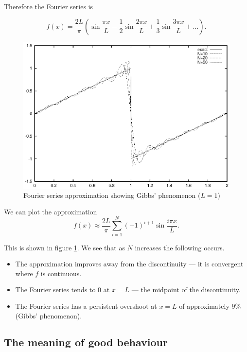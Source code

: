 \documentclass{notes}
\theoremstyle{plain}
\begin{document}
Therefore the Fourier series is

\[
f(x) = \frac{2 L}{\pi} \left( \sin \frac{\pi x}{L} -
\frac{1}{2} \sin \frac{2 \pi x}{L} + \frac{1}{3} \sin \frac{3 \pi
  x}{L}
+ \dots \right).
\]

\begin{figure}
\begin{center}
\includegraphics[scale=0.9]{sawtooth.eps}
\end{center}
\caption{Fourier series approximation showing Gibbs' phenomenon ($L = 1$)}%
\label{fig:sawtooth}
\end{figure}

We can plot the approximation
\[
f(x) \approx \frac{2 L}{\pi} \sum_{i=1}^N (-1)^{i+1} \sin \frac{i \pi x}{L}.
\]

This is shown in figure \ref{fig:sawtooth}.  We see that as $N$
increases the following occurs.

\begin{itemize}
\item The approximation improves away from the discontinuity --- it is
  convergent where $f$ is continuous.
\item The Fourier series tends to $0$ at $x=L$ --- the midpoint of the
  discontinuity.
\item The Fourier series has a persistent overshoot at $x=L$ of
  approximately $9 \%$ (Gibbs' phenomenon).
\end{itemize}

\subsection{The meaning of good behaviour}
\end{document}
